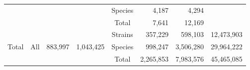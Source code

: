 \documentclass{beamer}
\begin{document}
\begin{frame}
\begin{table}[]
{\begin{tabular}{@{}cccccrcr@{}}
               &  &  &  & Species & 4,187 & \multicolumn{1}{r}{4,294} & \multicolumn{1}{l}{} \\
               &  &  &  & Total & 7,641 & \multicolumn{1}{r}{12,169} & \multicolumn{1}{l}{} \\
               \multirow{3}{*}{Total} & \multirow{3}{*}{All} & \multirow{3}{*}{883,997} & \multirow{3}{*}{1,043,425} & Strains & 357,229 & \multicolumn{1}{r}{598,103} & 12,473,903 \\
               &  &  &  & Species & 998,247 & \multicolumn{1}{r}{3,506,280} & 29,964,222 \\
               &  &  &  & Total & 2,265,853 & \multicolumn{1}{r}{7,983,576} & 45,465,085 \\ \cmidrule(l){5-8} 
               \end{tabular}%
         
            }
            \label{table:prego1}
         \end{table}
      
   \end{frame}
\end{document}
